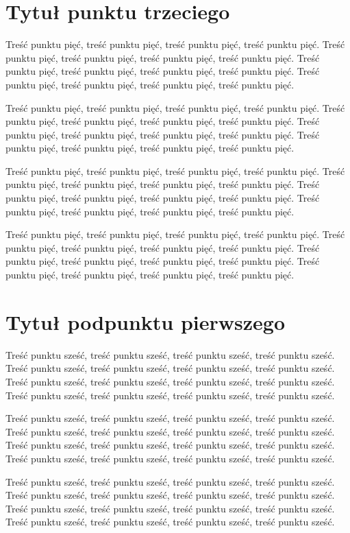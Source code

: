 \documentclass[brudnopis,xodstep]{wkmgr}
\begin{document}
\section{Tytuł punktu trzeciego}

Treść punktu pięć, treść punktu pięć, treść punktu pięć, treść punktu pięć.
Treść punktu pięć, treść punktu pięć, treść punktu pięć, treść punktu pięć.
Treść punktu pięć, treść punktu pięć, treść punktu pięć, treść punktu pięć.
Treść punktu pięć, treść punktu pięć, treść punktu pięć, treść punktu pięć.

Treść punktu pięć, treść punktu pięć, treść punktu pięć, treść punktu pięć.
Treść punktu pięć, treść punktu pięć, treść punktu pięć, treść punktu pięć.
Treść punktu pięć, treść punktu pięć, treść punktu pięć, treść punktu pięć.
Treść punktu pięć, treść punktu pięć, treść punktu pięć, treść punktu pięć.

Treść punktu pięć, treść punktu pięć, treść punktu pięć, treść punktu pięć.
Treść punktu pięć, treść punktu pięć, treść punktu pięć, treść punktu pięć.
Treść punktu pięć, treść punktu pięć, treść punktu pięć, treść punktu pięć.
Treść punktu pięć, treść punktu pięć, treść punktu pięć, treść punktu pięć.

Treść punktu pięć, treść punktu pięć, treść punktu pięć, treść punktu pięć.
Treść punktu pięć, treść punktu pięć, treść punktu pięć, treść punktu pięć.
Treść punktu pięć, treść punktu pięć, treść punktu pięć, treść punktu pięć.
Treść punktu pięć, treść punktu pięć, treść punktu pięć, treść punktu pięć.


\section{Tytuł podpunktu pierwszego}

Treść punktu sześć, treść punktu sześć, treść punktu sześć, treść punktu sześć.
Treść punktu sześć, treść punktu sześć, treść punktu sześć, treść punktu sześć.
Treść punktu sześć, treść punktu sześć, treść punktu sześć, treść punktu sześć.
Treść punktu sześć, treść punktu sześć, treść punktu sześć, treść punktu sześć.

Treść punktu sześć, treść punktu sześć, treść punktu sześć, treść punktu sześć.
Treść punktu sześć, treść punktu sześć, treść punktu sześć, treść punktu sześć.
Treść punktu sześć, treść punktu sześć, treść punktu sześć, treść punktu sześć.
Treść punktu sześć, treść punktu sześć, treść punktu sześć, treść punktu sześć.

Treść punktu sześć, treść punktu sześć, treść punktu sześć, treść punktu sześć.
Treść punktu sześć, treść punktu sześć, treść punktu sześć, treść punktu sześć.
Treść punktu sześć, treść punktu sześć, treść punktu sześć, treść punktu sześć.
Treść punktu sześć, treść punktu sześć, treść punktu sześć, treść punktu sześć.
\end{document}

